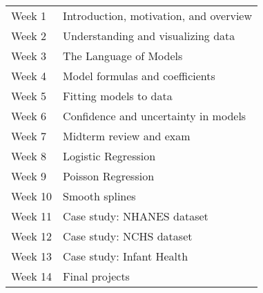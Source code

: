 \documentclass[10pt]{article}
\begin{document}
%
%
%
%
%
%  
%  

\bigskip

\begin{table}[htdp]
\begin{tabular}{ll}
Week 1 & Introduction, motivation, and overview \\
Week 2 & Understanding and visualizing data \\
Week 3 & The Language of Models\\
Week 4 & Model formulas and coefficients\\
Week 5 & Fitting models to data\\
Week 6 & Confidence and uncertainty in models\\
Week 7 & Midterm review and exam\\
Week 8 & Logistic Regression\\
Week 9 & Poisson Regression\\
Week 10 & Smooth splines\\
Week 11 & Case study: NHANES dataset\\
Week 12 & Case study: NCHS dataset\\
Week 13 & Case study: Infant Health\\
Week 14 & Final projects
\end{tabular}
\end{table}%
\end{document}
